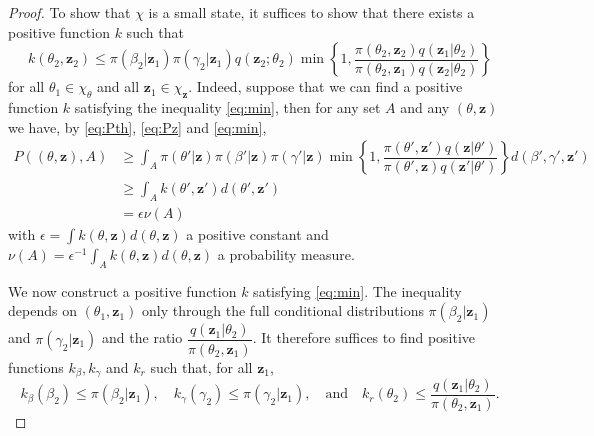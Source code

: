 \documentclass[12pt]{article}
\begin{document}
\begin{proof}
	To show that $\chi$ is a small state, it suffices to show that there exists a positive function $k$ such that
	\begin{equation}
		\label{eq:min}
		k(\theta_2, \mathbf{z}_2) \le \pi(\beta_2 | \mathbf{z}_1) \pi(\gamma_2 | \mathbf{z}_1) q(\mathbf{z}_2; \theta_2) \min\left\lbrace 1, \dfrac{\pi(\theta_2, \mathbf{z}_2)q(\mathbf{z}_1| \theta_2)}{\pi(\theta_2, \mathbf{z}_1)q(\mathbf{z}_2|\theta_2)} \right\rbrace
	\end{equation}
	for all $\theta_1 \in \chi_\theta$ and all $\mathbf{z}_1 \in \chi_\mathbf{z}.$
	Indeed, suppose that we can find a positive function $k$ satisfying the inequality \eqref{eq:min}, then for any set $A$ and any $(\theta, \mathbf{z})$ we have, by \eqref{eq:Pth}, \eqref{eq:Pz} and \eqref{eq:min},
	\begin{align*}
		P((\theta, \mathbf{z}), A)
		& \ge \int_A \pi(\theta' | \mathbf{z}) \pi(\beta' | \mathbf{z}) \pi(\gamma' | \mathbf{z}) \min\left\lbrace 1, \dfrac{\pi(\theta', \mathbf{z}')q(\mathbf{z}| \theta')}{\pi(\theta', \mathbf{z})q(\mathbf{z}'|\theta')} \right\rbrace d(\beta', \gamma', \mathbf{z}') \\
		& \ge \int_A k(\theta', \mathbf{z}') d(\theta', \mathbf{z}') \\
		& = \epsilon \nu(A)
	\end{align*}
	with $\epsilon = \int k(\theta, \mathbf{z}) d(\theta, \mathbf{z})$ a positive constant and $\nu(A) = \epsilon^{-1} \int_A k(\theta, \mathbf{z}) d(\theta, \mathbf{z})$ a probability measure. 
	
	We now construct a positive function $k$ satisfying \eqref{eq:min}. The inequality depends on $(\theta_1, \mathbf{z}_1)$ only through the full conditional distributions $\pi(\beta_2 | \mathbf{z}_1)$ and $\pi(\gamma_2 | \mathbf{z}_1)$ and the ratio $\dfrac{q(\mathbf{z}_1| \theta_2)}{\pi(\theta_2, \mathbf{z}_1)}$.
	It therefore suffices to find positive functions $k_\beta, k_\gamma$ and $k_r$ such that, for all $\mathbf{z}_1$,
	$$k_\beta(\beta_2) \le \pi(\beta_2 | \mathbf{z}_1),
	\quad k_\gamma(\gamma_2) \le \pi(\gamma_2 | \mathbf{z}_1),
	\quad \text{and} \quad k_r(\theta_2) \le \dfrac{q(\mathbf{z}_1|\theta_2)}{\pi(\theta_2, \mathbf{z}_1)}.$$
	

\end{proof}
\end{document}
